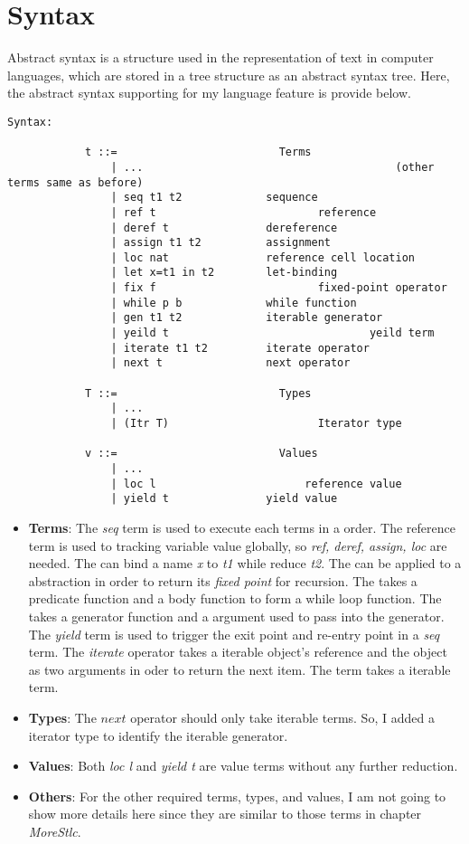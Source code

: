 \section{Syntax}
\label{sec:approach}
Abstract syntax is a structure used in the representation of text in computer languages, which are stored in a tree structure as an abstract syntax tree. Here, the abstract syntax supporting for my language feature is provide below.
%
\begin{lstlisting}[basicstyle=\small]
Syntax:

			t ::=                		  Terms
				| ...										(other terms same as before)
				| seq t1 t2             sequence
				| ref t					   	    reference 
				| deref t               dereference
				| assign t1 t2          assignment
				| loc nat               reference cell location
				| let x=t1 in t2        let-binding
				| fix f   					    fixed-point operator
				| while p b             while function 
				| gen t1 t2             iterable generator
				| yeild t								yeild term
				| iterate t1 t2         iterate operator
				| next t                next operator

			T ::=                		  Types
				| ...               		
				| (Itr T)				        Iterator type
			
			v ::=                		  Values
				| ... 
				| loc l				          reference value
				| yield t               yield value
\end{lstlisting}
\begin{itemize}
	\item 
	\textbf{Terms}: The \textit{seq} term is used to execute each terms in a order. 
	The reference term is used to tracking variable value globally, so \textit{ref, deref, assign, loc} are needed. The \lt can bind a name \textit{x} to \textit{t1} while reduce \textit{t2}. 
	The \fix can be applied to a abstraction in order to return its \textit{fixed point} for recursion. 
	The \while takes a predicate function and a body function to form a while loop function. 
	The \gen takes a generator function and a argument used to pass into the generator. 
	The \textit{yield} term is used to trigger the exit point and re-entry point in a \textit{seq} term.
	The \textit{iterate} operator takes a iterable object's reference and the object as two arguments in oder to return the next item.
	The \nt term takes a iterable term.
	\item 
	\textbf{Types}: The $next$ operator should only take iterable terms. 
	So, I added a iterator type to identify the iterable generator. 
	\item 
	\textbf{Values}: Both \textit{loc l} and \textit{yield t} are value terms without any further reduction.
	\item 
	\textbf{Others}: For the other required terms, types, and values, I am not going to show more details here since they are similar to those terms in chapter \textit{MoreStlc}.
\end{itemize}